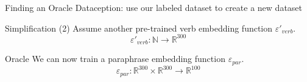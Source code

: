 \documentclass{beamer}
\begin{document}
\begin{frame}{Finding an Oracle}
Dataception: use our labeled dataset to create a new dataset

\pause
\begin{block}{Simplification (2)}
Assume another pre-trained \alert{verb embedding function} $\varepsilon '_{verb}$.
  	\[
  	\varepsilon '_{verb}: \mathbb{N} \to \mathbb{R}^{300}
  	\]
\end{block}

\pause
\begin{block}{Oracle}
We can now train a \alert{paraphrase embedding function} $\varepsilon_{par}$.
	\[
	\varepsilon_{par}: \mathbb{R}^{300} \times \mathbb{R}^{300} \to \mathbb{R}^{100}
	\]
\end{block}
\end{frame}
\end{document}
